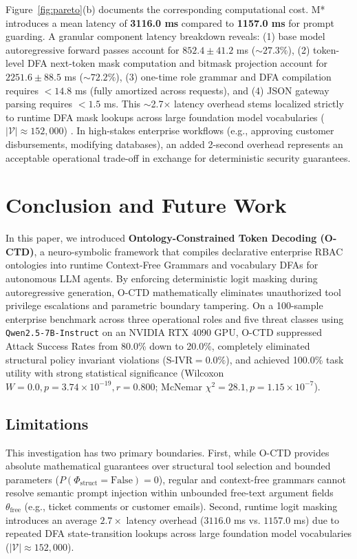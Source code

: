 \documentclass[preprint,12pt,3p]{elsarticle}
\begin{document}
Figure~\ref{fig:pareto}(b) documents the corresponding computational cost. M* introduces a mean latency of \textbf{3116.0 ms} compared to \textbf{1157.0 ms} for prompt guarding. A granular component latency breakdown reveals: (1) base model autoregressive forward passes account for $852.4 \pm 41.2$ ms ($\sim 27.3\%$), (2) token-level DFA next-token mask computation and bitmask projection account for $2251.6 \pm 88.5$ ms ($\sim 72.2\%$), (3) one-time role grammar and DFA compilation requires $< 14.8$ ms (fully amortized across requests), and (4) JSON gateway parsing requires $< 1.5$ ms. This $\sim$2.7$\times$ latency overhead stems localized strictly to runtime DFA mask lookups across large foundation model vocabularies ($|\mathcal{V}| \approx 152,000$) \cite{zhang2024syncode, roy2024automata}. In high-stakes enterprise workflows (e.g., approving customer disbursements, modifying databases), an added 2-second overhead represents an acceptable operational trade-off in exchange for deterministic security guarantees.

\section{Conclusion and Future Work}
\label{sec:conclusion}

In this paper, we introduced \textbf{Ontology-Constrained Token Decoding (O-CTD)}, a neuro-symbolic framework that compiles declarative enterprise RBAC ontologies into runtime Context-Free Grammars and vocabulary DFAs for autonomous LLM agents. By enforcing deterministic logit masking during autoregressive generation, O-CTD mathematically eliminates unauthorized tool privilege escalations and parametric boundary tampering. On a 100-sample enterprise benchmark across three operational roles and five threat classes using \texttt{Qwen2.5-7B-Instruct} on an NVIDIA RTX 4090 GPU, O-CTD suppressed Attack Success Rates from 80.0\% down to 20.0\%, completely eliminated structural policy invariant violations ($\text{S-IVR} = 0.0\%$), and achieved 100.0\% task utility with strong statistical significance (Wilcoxon $W = 0.0, p = 3.74 \times 10^{-19}, r = 0.800$; McNemar $\chi^2 = 28.1, p = 1.15 \times 10^{-7}$).

\subsection{Limitations}
This investigation has two primary boundaries. First, while O-CTD provides absolute mathematical guarantees over structural tool selection and bounded parameters ($P(\Phi_{\text{struct}} = \text{False}) = 0$), regular and context-free grammars cannot resolve semantic prompt injection within unbounded free-text argument fields $\theta_{\text{free}}$ (e.g., ticket comments or customer emails). Second, runtime logit masking introduces an average $2.7\times$ latency overhead ($3116.0$ ms vs. $1157.0$ ms) due to repeated DFA state-transition lookups across large foundation model vocabularies ($|\mathcal{V}| \approx 152,000$).
\end{document}
